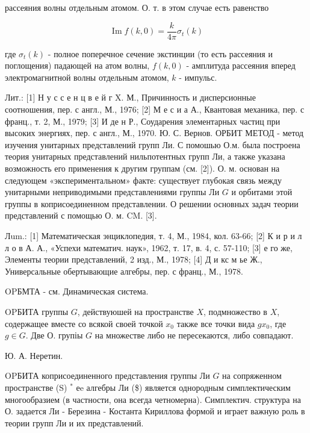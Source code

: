 \documentclass[10pt]{article}
\begin{document}
рассеяния волны отдельным атомом. О. т. в этом случае есть равенство



\[

\operatorname{Im} f(k, 0)=\frac{k}{4 \pi} \sigma_{t}(k)

\]



где $\sigma_{t}(k)$ - полное поперечное сечение экстинции (то есть рассеяния и поглощения) падающей на атом волны, $f(k, 0)$ - амплитуда рассеяния вперед электромагнитной волны отдельным атомом, $k$ - импульс.



Лит.: [1] Н у с с е н ц в е й г X. М., Причинность и дисперсионные соотношения, пер. с англ., М., 1976; [2] М е с и а А., Квантовая механика, пер. с франц., т. 2, М., 1979; [3] И де н Р., Соударения элементарных частиц при высоких энергиях, пер. с англ., М., 1970. Ю. С. Вернов. ОРБИТ МЕТОД - метод изучения унитарных представлений групп Ли. С помошью О.м. была построена теория унитарных представлений нильпотентных групп Ли, а также указана возможность его применения к другим группам (см. [2]). О. м. основан на следующем «экспериментальном» факте: существует глубокая связь между унитарными неприводимыми представлениями группы Ли $G$ и орбитами этой группы в коприсоединенном представлении. О решении основных задач теории представлений с помощью О. м. CM. [3].



Лum.: [1] Математическая энциклопедия, т. 4, М., 1984, кол. 63-66; [2] К и р и л л о в А. А., «Успехи математич. наук», 1962, т. 17, в. 4, с. 57-110; [3] е го же, Элементы теории представлений, 2 изд., М., 1978; [4] Д и кс м ье Ж., Универсальные обертывающие алгебры, пер. с франц., М., 1978.



OPБМТА - см. Динамическая система.



OPБИТА группы $G$, действуюшей на пространстве $X$, подмножество в $X$, содержащее вместе со всякой своей точкой $x_{0}$ также все точки вида $g x_{0}$, где $g \in G$. Две О. групіы $G$ на множестве либо не пересекаются, либо совпадают.



Ю. А. Неретин.



OPБИТА коприсоединенного представления группы Ли $G$ на сопряженном пространстве (S) ${ }^{*}$ еe алгебры Ли (\$) является однородным симплектическим многообразием (в частности, она всегда четномерна). Симплектич. структура на О. задается Ли - Березина - Костанта Кириллова формой и играет важную роль в теории групп Ли и их представлений.
\end{document}
